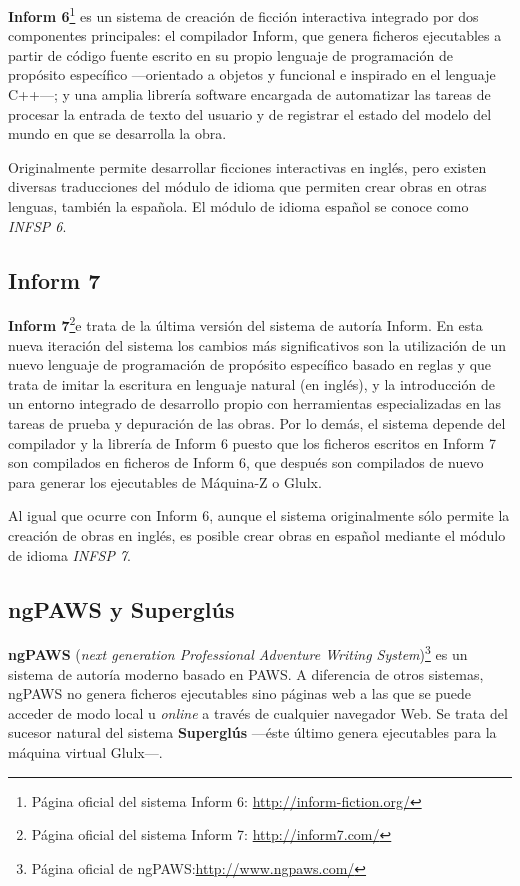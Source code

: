 \textbf{Inform 6}\footnote{Página oficial del sistema Inform 6: \url{http://inform-fiction.org/}} es un sistema de creación de ficción interactiva integrado por dos componentes principales: el compilador Inform, que genera ficheros ejecutables a partir de código fuente escrito en su propio lenguaje de programación de propósito específico ---orientado a objetos y funcional e inspirado en el lenguaje C++---; y una amplia librería software encargada de automatizar las tareas de procesar la entrada de texto del usuario y de registrar el estado del modelo del mundo en que se desarrolla la obra.

Originalmente permite desarrollar ficciones interactivas en inglés, pero existen diversas traducciones del módulo de idioma que permiten crear obras en otras lenguas, también la española. El módulo de idioma español se conoce como \emph{INFSP 6}.

\subsection{Inform 7}

\textbf{Inform 7}\footnote{Página oficial del sistema Inform 7: \url{http://inform7.com/}}e trata de la última versión del sistema de autoría Inform. En esta nueva iteración del sistema los cambios más significativos son la utilización de un nuevo lenguaje de programación de propósito específico basado en reglas y que trata de imitar la escritura en lenguaje natural (en inglés), y la introducción de un entorno integrado de desarrollo propio con herramientas especializadas en las tareas de prueba y depuración de las obras. Por lo demás, el sistema depende del compilador y la librería de Inform 6 puesto que los ficheros escritos en Inform 7 son compilados en ficheros de Inform 6, que después son compilados de nuevo para generar los ejecutables de Máquina-Z o Glulx.

Al igual que ocurre con Inform 6, aunque el sistema originalmente sólo permite la creación de obras en inglés, es posible crear obras en español mediante el módulo de idioma \emph{INFSP 7}.

\subsection{ngPAWS y Superglús}

\textbf{ngPAWS} (\emph{next generation Professional Adventure Writing System})\footnote{Página oficial de ngPAWS:\url{http://www.ngpaws.com/}} es un sistema de autoría moderno basado en PAWS. A diferencia de otros sistemas, ngPAWS no genera ficheros ejecutables sino páginas web a las que se puede acceder de modo local u \emph{online} a través de cualquier navegador Web. Se trata del sucesor natural del sistema \textbf{Superglús} ---éste último genera ejecutables para la máquina virtual Glulx---.


